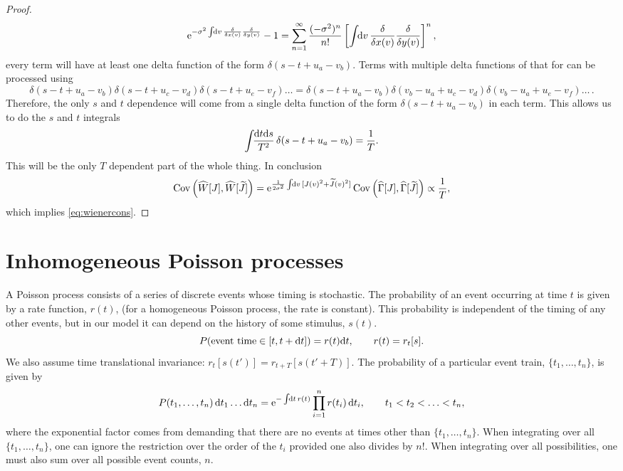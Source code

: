 \documentclass[12pt]{article}
\theoremstyle{slplain}
\theoremstyle{sldefinition}
\theoremstyle{remark}
\newcommand{\tj}{\widetilde{J}}
\newcommand{\hz}{\widehat{\Gamma}}
\newcommand{\hw}{\widehat{W}}
\begin{document}
\begin{proof}
  \begin{equation*}
    \e^{-\sigma^2\intd{v}\fdf{}{x(v)}\fdf{}{y(v)}}-1 =
      \sum_{n=1}^\infty \frac{(-\sigma^2)^n}{n!} \brk{ \intd{v}\fdf{}{x(v)}\fdf{}{y(v)} }^n,
  \end{equation*}
  every term will have at least one delta function of the form $\delta(s-t+u_a-v_b)$. Terms with multiple delta functions of that for can be processed using
  \begin{equation*}
    \delta(s-t+u_a-v_b)\delta(s-t+u_c-v_d)\delta(s-t+u_e-v_f)\ldots
    = \delta(s-t+u_a-v_b)\delta(v_b-u_a+u_c-v_d)\delta(v_b-u_a+u_e-v_f)\ldots \,.
  \end{equation*}
  Therefore, the only $s$ and $t$ dependence will come from a single delta function of the form $\delta(s-t+u_a-v_b)$ in each term. This allows us to do the $s$ and $t$ integrals
  \begin{equation*}
    \int\!\!\frac{\mathrm{d} t\mathrm{d} s}{T^2}\,\delta(s-t+u_a-v_b) = \frac{1}{T}.
  \end{equation*}
  This will be the only $T$ dependent part of the whole thing. In conclusion
  \begin{equation}\label{eq:wienergenconspf}
    \cov\prn{\hw[J],\hw[\tj]} =  \e^{\frac{1}{2\sigma^2} \intd{v}[J(v)^2 + \tj(v)^2]} \cov\prn{\hz[J],\hz[\tj]}
    \propto \frac{1}{T},
  \end{equation}
  which implies \eqref{eq:wienercons}.
\end{proof}


\section{Inhomogeneous Poisson processes}\label{sec:poisson}

A Poisson process consists of a series of discrete events whose timing is stochastic. The probability of an event occurring at time $t$ is given by a rate function, $r(t)$, (for a homogeneous Poisson process, the rate is constant). This probability is independent of the timing of any other events, but in our model it can depend on the history of some stimulus, $s(t)$.
%
\begin{equation}\label{eq:poissonrate}
  P(\text{event time}\in[t,t+\mathrm{d} t]) = r(t)\mathrm{d} t,
  \qquad
  r(t) = r_t[s].
\end{equation}
%
We also assume time translational invariance: $r_t[s(t')] = r_{t+T}[s(t'+T)]$. The probability of a particular event train, $\{t_1,\ldots,t_n\}$, is given by
%
\begin{equation}\label{eq:evtrain}
  P(t_1,\ldots,t_n)\,\dr t_1\ldots \dr t_n = \e^{-\intd{t}r(t)} \prod_{i=1}^n r(t_i)\,\dr t_i, \qquad t_1<t_2<\ldots<t_n,
\end{equation}
%
where the exponential factor comes from demanding that there are no events at times other than $\{t_1,\ldots,t_n\}$. When integrating over all $\{t_1,\ldots,t_n\}$, one can ignore the restriction over the order of the $t_i$ provided one also divides by $n!$. When integrating over all possibilities, one must also sum over all possible event counts, $n$.
\end{document}
